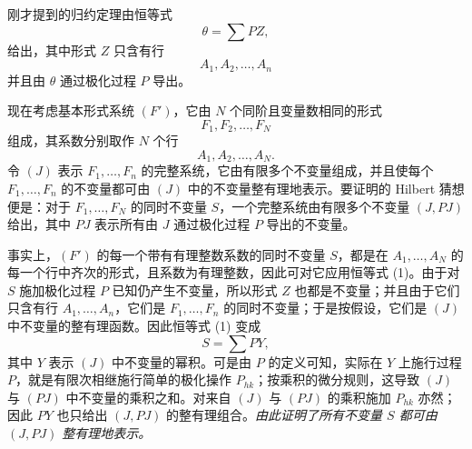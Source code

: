 刚才提到的归约定理由恒等式
\begin{equation}
  \theta=\sum PZ,
\tag{1}
\end{equation}
给出，其中形式 $Z$ 只含有行
\[
  A_1,A_2,\ldots,A_n
\]
并且由 $\theta$ 通过极化过程 $P$ 导出。

现在考虑基本形式系统 $(F')$，它由 $N$ 个同阶且变量数相同的形式
\[
  F_1,F_2,\ldots,F_N
\]
组成，其系数分别取作 $N$ 个行
\[
  A_1,A_2,\ldots,A_N.
\]
令 $(J)$ 表示 $F_1,\ldots,F_n$ 的完整系统，它由有限多个不变量组成，并且使每个 $F_1,\ldots,F_n$ 的不变量都可由 $(J)$ 中的不变量整有理地表示。要证明的 Hilbert 猜想便是：对于 $F_1,\ldots,F_N$ 的同时不变量 $S$，一个完整系统由有限多个不变量 $(J,PJ)$ 给出，其中 $PJ$ 表示所有由 $J$ 通过极化过程 $P$ 导出的不变量。

事实上，$(F')$ 的每一个带有有理整数系数的同时不变量 $S$，都是在 $A_1,\ldots,A_N$ 的每一个行中齐次的形式，且系数为有理整数，因此可对它应用恒等式 (1)。由于对 $S$ 施加极化过程 $P$ 已知仍产生不变量，所以形式 $Z$ 也都是不变量；并且由于它们只含有行 $A_1,\ldots,A_n$，它们是 $F_1,\ldots,F_n$ 的同时不变量；于是按假设，它们是 $(J)$ 中不变量的整有理函数。因此恒等式 (1) 变成
\[
  S=\sum PY,
\]
其中 $Y$ 表示 $(J)$ 中不变量的幂积。可是由 $P$ 的定义可知，实际在 $Y$ 上施行过程 $P$，就是有限次相继施行简单的极化操作 $P_{hk}$；按乘积的微分规则，这导致 $(J)$ 与 $(PJ)$ 中不变量的乘积之和。对来自 $(J)$ 与 $(PJ)$ 的乘积施加 $P_{hk}$ 亦然；因此 $PY$ 也只给出 $(J,PJ)$ 的整有理组合。\emph{由此证明了所有不变量 $S$ 都可由 $(J,PJ)$ 整有理地表示。}

